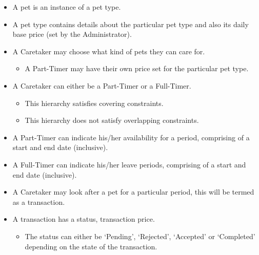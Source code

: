 \documentclass[10pt]{article}
\begin{document}
\begin{itemize}
\begin{itemize}
\begin{itemize}
        \end{itemize}
        \item A pet is an instance of a pet type.
        \item A pet type contains details about the particular pet type and also its daily base price (set by the Administrator).
        \item A Caretaker may choose what kind of pets they can care for.
        \begin{itemize}
            \item A Part-Timer may have their own price set for the particular pet type.
        \end{itemize}
        \item A Caretaker can either be a Part-Timer or a Full-Timer.
        \begin{itemize}
            \item This hierarchy satisfies covering constraints.
            \item This hierarchy does not satisfy overlapping constraints.
        \end{itemize}
        \item A Part-Timer can indicate his/her availability for a period, comprising of a start and end date (inclusive).
        \item A Full-Timer can indicate his/her leave periods, comprising of a start and end date (inclusive).
        \item A Caretaker may look after a pet for a particular period, this will be termed as a transaction.
        \item A transaction has a status, transaction price.
        \begin{itemize}
            \item The status can either be `Pending', `Rejected', `Accepted' or `Completed' depending on the state of the transaction.

\end{itemize}
\end{itemize}
\end{itemize}
\end{document}
